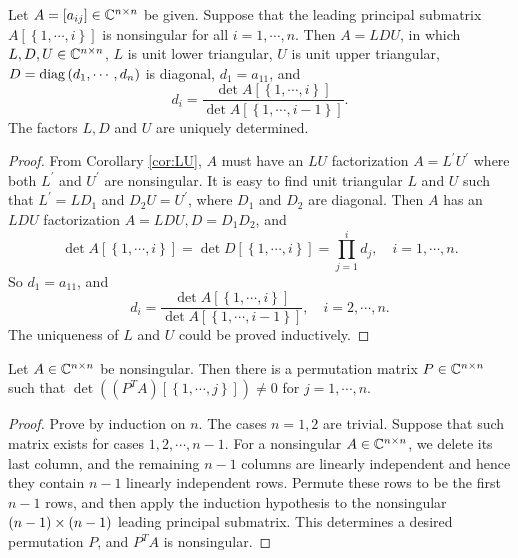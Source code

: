 \documentclass[12pt]{article}
\begin{document}
\begin{corollary}
    Let \(A=\left[a_{ij}\right]\in\mathbb C^{n\times n}\) be given. Suppose that the leading principal submatrix \(A\left[\left\{1,\cdots,i\right\}\right]\) is nonsingular for all \(i=1,\cdots,n\). Then \(A=LDU\), in which \(L,D,U\in\mathbb C^{n\times n}\), \(L\) is unit lower triangular, \(U\) is unit upper triangular, \(D=\operatorname{diag}\left(d_1,\cdots,d_n\right)\) is diagonal, \(d_1=a_{11}\), and
    \[d_i=\frac{\det A\left[\left\{1,\cdots,i\right\}\right]}{\det A\left[\left\{1,\cdots,i-1\right\}\right]}.\]
    The factors \(L,D\) and \(U\) are uniquely determined.
\end{corollary}
\begin{proof}
    From Corollary \ref{cor:LU}, \(A\) must have an \(LU\) factorization \(A=L^\prime U^\prime\) where both \(L^\prime\) and \(U^\prime\) are nonsingular. It is easy to find unit triangular \(L\) and \(U\) such that \(L^\prime=LD_1\) and \(D_2U=U^\prime\), where \(D_1\) and \(D_2\) are diagonal. Then \(A\) has an \(LDU\) factorization \(A=LDU,D=D_1D_2\), and
    \[\det A\left[\left\{1,\cdots,i\right\}\right]=\det D\left[\left\{1,\cdots,i\right\}\right]=\prod_{j=1}^id_j,\quad i=1,\cdots,n.\]
    So \(d_1=a_{11}\), and
    \[d_i=\frac{\det A\left[\left\{1,\cdots,i\right\}\right]}{\det A\left[\left\{1,\cdots,i-1\right\}\right]},\quad i=2,\cdots,n.\]
    The uniqueness of \(L\) and \(U\) could be proved inductively.
\end{proof}

\begin{lemma}\label{lem:permute}
    Let \(A\in\mathbb C^{n\times n}\) be nonsingular. Then there is a permutation matrix \(P\in\mathbb C^{n\times n}\) such that \(\det\left(\left(P^TA\right)\left[\left\{1,\cdots,j\right\}\right]\right)\neq 0\) for \(j=1,\cdots,n\).
\end{lemma}
\begin{proof}
    Prove by induction on \(n\). The cases \(n=1,2\) are trivial. Suppose that such matrix exists for cases \(1,2,\cdots,n-1\). For a nonsingular \(A\in\mathbb C^{n\times n}\), we delete its last column, and the remaining \(n-1\) columns are linearly independent and hence they contain \(n-1\) linearly independent rows. Permute these rows to be the first \(n-1\) rows, and then apply the induction hypothesis to the nonsingular \((n-1)\times(n-1)\) leading principal submatrix. This determines a desired permutation \(P\), and \(P^TA\) is nonsingular.
\end{proof}
\end{document}

